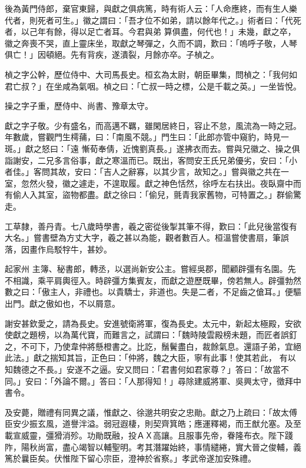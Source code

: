 \begin{pinyinscope}
 後為黃門侍郎，棄官東歸，與獻之俱病篤，時有術人云：「人命應終，而有生人樂代者，則死者可生。」徽之謂曰：「吾才位不如弟，請以餘年代之。」術者曰：「代死者，以己年有餘，得以足亡者耳。今君與弟
 算俱盡，何代也！」未幾，獻之卒，徽之奔喪不哭，直上靈床坐，取獻之琴彈之，久而不調，歎曰：「嗚呼子敬，人琴俱亡！」因頓絕。先有背疾，遂潰裂，月餘亦卒。子楨之。



 楨之字公幹，歷位侍中、大司馬長史。桓玄為太尉，朝臣畢集，問楨之：「我何如君亡叔？」在坐咸為氣咽。楨之曰：「亡叔一時之標，公是千載之英。」一坐皆悅。



 操之字子重，歷侍中、尚書、豫章太守。



 獻之字子敬。少有盛名，而高邁不羈，雖閑居終日，容止不怠，風流為一時之冠。年數歲，嘗觀門生樗蒱，曰：「南風不競。」門生曰：「此郎亦管中窺豹，時見一斑。」獻之怒曰：「遠
 慚荀奉倩，近愧劉真長。」遂拂衣而去。嘗與兄徽之、操之俱詣謝安，二兄多言俗事，獻之寒溫而已。既出，客問安王氏兄弟優劣，安曰：「小者佳。」客問其故，安曰：「吉人之辭寡，以其少言，故知之。」嘗與徽之共在一室，忽然火發，徽之遽走，不遑取履。獻之神色恬然，徐呼左右扶出。夜臥齋中而有偷人入其室，盜物都盡。獻之徐曰：「偷兒，氈青我家舊物，可特置之。」群偷驚走。



 工草隸，善丹青。七八歲時學書，羲之密從後掣其筆不得，歎曰：「此兒後當復有大名。」嘗書壁為方丈大字，羲之甚以為能，觀者數百人。桓溫嘗使書扇，筆誤落，因畫作烏駁牸牛，甚妙。



 起家州
 主簿、秘書郎，轉丞，以選尚新安公主。嘗經吳郡，聞顧辟彊有名園。先不相識，乘平肩輿徑入。時辟彊方集賓友，而獻之遊歷既畢，傍若無人。辟彊勃然數之曰：「傲主人，非禮也。以貴驕士，非道也。失是二者，不足齒之傖耳。」便驅出門。獻之傲如也，不以屑意。



 謝安甚欽愛之，請為長史。安進號衛將軍，復為長史。太元中，新起太極殿，安欲使獻之題榜，以為萬代寶，而難言之，試謂曰：「魏時陵雲殿榜未題，而匠者誤釘之，不可下，乃使韋仲將懸橙書之。比訖，鬚鬢盡白，裁餘氣息。還語子弟，宜絕此法。」獻之揣知其旨，正色曰：「仲將，魏之大臣，寧有此事！使其若此，
 有以知魏德之不長。」安遂不之逼。安又問曰：「君書何如君家尊？」答曰：「故當不同。」安曰：「外論不爾。」答曰：「人那得知！」尋除建威將軍、吳興太守，徵拜中書令。



 及安薨，贈禮有同異之議，惟獻之、徐邈共明安之忠勛。獻之乃上疏曰：「故太傅臣安少振玄風，道譽泮溢。弱冠遐棲，則契齊箕皓；應運釋褐，而王猷允塞。及至載宣威靈，彊猾消殄。功勛既融，投ＡＸ高讓。且服事先帝，眷隆布衣。陛下踐阼，陽秋尚富，盡心竭智以輔聖明。考其潛躍始終，事情繾綣，實大晉之俊輔，義篤於曩臣矣。伏惟陛下留心宗臣，澄神於省察。」孝武帝遂加安殊禮。




\end{pinyinscope}
